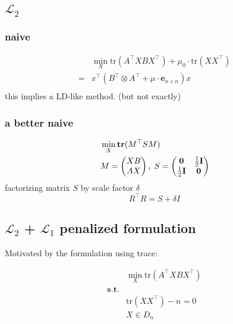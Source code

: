 \documentclass[
  10pt,
  a4paper,
,tablecaptionabove
]{scrartcl}
\begin{document}
\hypertarget{mathscr-l_2}{%
\subsection{\texorpdfstring{\(\mathscr L_2\)}{\textbackslash mathscr L\_2}}\label{mathscr-l_2}}

\hypertarget{naive}{%
\subsubsection{naive}\label{naive}}

\[\begin{aligned}
&\min_X\textrm{tr}(A^\top XB X^\top) + \mu_0 \cdot \textrm{tr}(X X^{\top}) \\
= & x^\top (B^\top \otimes A^\top + \mu\cdot  \mathbf e_{n\times n}) x\\ 
\end{aligned} \] this implies a LD-like method. (but not exactly)

\hypertarget{a-better-naive}{%
\subsubsection{a better naive}\label{a-better-naive}}

\[\begin{aligned}
&\min_X \mathbf{tr}(M^\top SM) \\&M=\begin{pmatrix}XB\\AX\end{pmatrix},\; S = \begin{pmatrix}\bf{0} & \frac{1}{2}\mathbf{I}\\\frac{1}{2}\mathbf{I} & \bf{0} \end{pmatrix} 
\end{aligned}\] factorizing matrix \(S\) by scale factor \(\delta\)
\[R^\top R = S + \delta I\]

\hypertarget{mathscr-l_2-mathscr-l_1-penalized-formulation}{%
\subsection{\texorpdfstring{\(\mathscr L_2\) + \(\mathscr L_1\)
penalized
formulation}{\textbackslash mathscr L\_2 + \textbackslash mathscr L\_1 penalized formulation}}\label{mathscr-l_2-mathscr-l_1-penalized-formulation}}

Motivated by the formulation using trace:

\[\begin{aligned}
& \min_X  \textrm{tr}(A^\top XB X^\top) \\
\mathbf{s.t.} &\\
&   \textrm{tr}(XX^\top ) -  n = 0 \\
& X \in D_n
\end{aligned}\]
\end{document}
